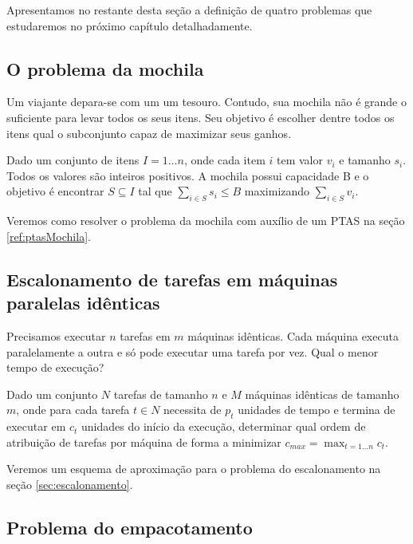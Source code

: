 Apresentamos no restante desta seção a definição de quatro problemas que estudaremos no próximo capítulo detalhadamente.

\subsection{O problema da mochila}
\label{sec:defmochila}

Um viajante depara-se com um um tesouro. Contudo, sua mochila não é grande o suficiente para levar todos os seus itens. Seu objetivo é escolher dentre todos os itens qual o subconjunto capaz de maximizar seus ganhos.

\begin{definition}
Dado um conjunto de itens $I = {1 \ldots n}$, onde cada item $i$ tem valor $v_i$ e tamanho $s_i$. Todos os valores são inteiros positivos. A mochila possui capacidade B e o objetivo é encontrar $ S \subseteq I $  tal que $\sum_{i \in S} s_i \leq  B$ maximizando $\sum_{i \in S} v_i$.
\end{definition}

Veremos como resolver o problema da mochila com auxílio de um PTAS na seção \ref{ref:ptasMochila}.

\subsection{Escalonamento de tarefas em máquinas paralelas idênticas}

Precisamos executar $n$ tarefas em $m$ máquinas idênticas. Cada máquina executa paralelamente a outra e só pode executar uma tarefa por vez. Qual o menor tempo de execução?

\begin{definition}
Dado um conjunto $N$ tarefas de tamanho $n$ e $M$ máquinas idênticas de tamanho $m$, onde para cada tarefa $t \in N$ necessita de $p_t$ unidades de tempo e termina de executar em $c_t$ unidades do início da execução, determinar qual ordem de atribuição de tarefas por máquina de forma a minimizar $c_{max} = \max_{t=1 \ldots n} c_t$.
\end{definition}

Veremos um esquema de aproximação para o problema do escalonamento na seção \ref{sec:escalonamento}.

\subsection{Problema do empacotamento}

